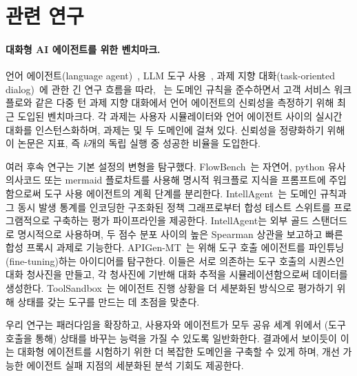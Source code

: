 \section{관련 연구}

\paragraph{대화형 AI 에이전트를 위한 벤치마크.}
언어 에이전트(language agent)~\cite{yao2022webshop, zhou2023webarena, jimenez2023swe, liu2023agentbench, ruan2023identifying}, LLM 도구 사용~\cite{berkeley-function-calling-leaderboard,qin2024toolllm,huang2023metatool}, 과제 지향 대화(task-oriented dialog)~\cite{chen2021action, budzianowski2018multiwoz, andreas2020task,schatzmann2007evaluating,gur2018hidden,he2018decoupling,Hu_2023}에 관한 긴 연구 흐름을 따라, \taubench~\cite{yao2024tau}는 도메인 규칙을 준수하면서 고객 서비스 워크플로와 같은 다중 턴 과제 지향 대화에서 언어 에이전트의 신뢰성을 측정하기 위해 최근 도입된 벤치마크다.  각 과제는 사용자 시뮬레이터와 언어 에이전트 사이의 실시간 대화를 인스턴스화하며, 과제는 \retail 및 \airline 두 도메인에 걸쳐 있다. 신뢰성을 정량화하기 위해 이 논문은 \passk 지표, 즉 \textit{k}개의 독립 실행 중 성공한 비율을 도입한다.

 여러 후속 연구는 기본 설정의 변형을 탐구했다. FlowBench~\cite{xiao2024flowbench}는 자연어, python 유사 의사코드 또는 mermaid 플로차트를 사용해 명시적 워크플로 지식을 프롬프트에 주입함으로써 도구 사용 에이전트의 계획 단계를 분리한다. IntellAgent~\cite{levi2025intellagent}는 도메인 규칙과 그 동시 발생 통계를 인코딩한 구조화된 정책 그래프로부터 합성 테스트 스위트를 프로그램적으로 구축하는 평가 파이프라인을 제공한다. IntellAgent는  외부 골드 스탠더드로 명시적으로 사용하며, 두 점수 분포 사이의 높은 Spearman 상관을 보고하고 빠른 합성 프록시 과제로 기능한다. APIGen-MT~\cite{prabhakar2025apigen}는  위해 도구 호출 에이전트를 파인튜닝(fine-tuning)하는 아이디어를 탐구한다. 이들은 서로 의존하는 도구 호출의 시퀀스인 대화 청사진을 만들고, 각 청사진에 기반해 대화 추적을 시뮬레이션함으로써 데이터를 생성한다. ToolSandbox~\cite{lu2024toolsandbox}는 에이전트 진행 상황을 더 세분화된 방식으로 평가하기 위해 상태를 갖는 도구를 만드는 데 초점을 맞춘다.

우리 연구는 \taubench 패러다임을 확장하고, 사용자와 에이전트가 모두 공유 세계 위에서 (도구 호출을 통해) 상태를 바꾸는 능력을 가질 수 있도록 일반화한다. 결과에서 보이듯이 이는 대화형 에이전트를 시험하기 위한 더 복잡한 도메인을 구축할 수 있게 하며, 개선 가능한 에이전트 실패 지점의 세분화된 분석 기회도 제공한다.


